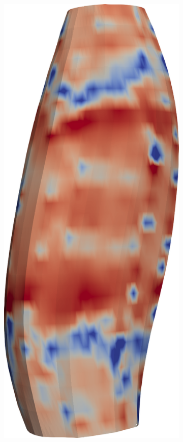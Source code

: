 \begin{figure}[H]
\begin{subfigure}[t]{0.25\textwidth}
    \includegraphics[width=\textwidth]{images/results/application/fibers_emg_thin_fat.png}%

\end{subfigure}
\end{figure}
